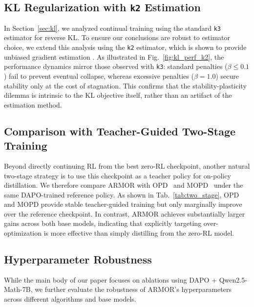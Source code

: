 \subsection{KL Regularization with \texttt{k2} Estimation}
In Section~\ref{sec:kl}, we analyzed continual training using the standard \texttt{k3} estimator for reverse KL.
To ensure our conclusions are robust to estimator choice, we extend this analysis using the \texttt{k2} estimator, which is shown to provide unbiased gradient estimation \citep{klpitfalls}.
As illustrated in Fig.~\ref{fig:kl_perf_k2}, the performance dynamics mirror those observed with \texttt{k3}: standard penalties ($\beta \le 0.1$) fail to prevent eventual collapse, whereas excessive penalties ($\beta=1.0$) secure stability only at the cost of stagnation.
This confirms that the stability-plasticity dilemma is intrinsic to the KL objective itself, rather than an artifact of the estimation method.

\subsection{Comparison with Teacher-Guided Two-Stage Training}\label{appendix:two_stage}

Beyond directly continuing RL from the best zero-RL checkpoint, another natural two-stage strategy is to use this checkpoint as a teacher policy for on-policy distillation.
We therefore compare ARMOR with OPD~\citep{agarwal2024policy} and MOPD~\citep{xiao2026mimo} under the same DAPO-trained reference policy.
As shown in Tab.~\ref{tab:two_stage}, OPD and MOPD provide stable teacher-guided training but only marginally improve over the reference checkpoint.
In contrast, ARMOR achieves substantially larger gains across both base models, indicating that explicitly targeting over-optimization is more effective than simply distilling from the zero-RL model.

\subsection{Hyperparameter Robustness}

While the main body of our paper focuses on ablations using DAPO + Qwen2.5-Math-7B, we further evaluate the robustness of ARMOR's hyperparameters across different algorithms and base models.


